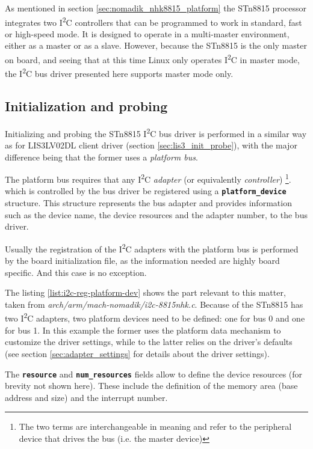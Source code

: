 \documentclass[a4paper,10pt]{article}
\newcommand{\icc}{I\textsuperscript{2}C }
\newcommand{\keyword}[1]{\texttt{\textbf{#1}}}
\begin{document}
\begin{multicols}{2}
As mentioned in section \ref{sec:nomadik_nhk8815_platform} the STn8815 processor
integrates two \icc controllers that can be programmed to work in standard, fast
or high-speed mode. It is designed to operate in a multi-master environment,
either as a master or as a slave. However, because the STn8815 is the only master
on board, and seeing that at this time Linux only operates \icc in master mode, 
the \icc bus driver presented here supports master mode only.


\subsection{Initialization and probing}
\label{sec:adapter_init_probe}
Initializing and probing the STn8815 \icc bus driver is performed in a similar
way as for LIS3LV02DL client driver (section \ref{sec:lis3_init_probe}), with
the major difference being that the former uses a \emph{platform bus}.

The platform bus requires that any \icc \emph{adapter} (or equivalently
\emph{controller})
\footnote{The two terms are interchangeable in meaning and refer to the
peripheral device that drives the bus (i.e. the master device)}.
which is controlled by the bus driver be registered using a \keyword{platform\_device} structure.
This structure represents the bus adapter and provides information such as the
device name, the device resources and the adapter number, to the bus driver.

Usually the registration of the \icc adapters with the platform bus is
performed by the board initialization file, as the information needed are
highly board specific. And this case is no exception.

The listing \ref{list:i2c-reg-platform-dev} shows the part relevant to this
matter, taken from \emph{arch/arm/mach-nomadik/i2c-8815nhk.c}. Because of the
STn8815 has two \icc adapters, two platform devices need to be defined: one for
bus 0 and one for bus 1.
In this example the former uses the platform data mechanism to customize the
driver settings, while to the latter relies on the driver's defaults
(see section \ref{sec:adapter_settings} for details about the driver settings).

The \keyword{resource} and \keyword{num\_resources} fields allow to define
the device resources (for brevity not shown here). These include the
definition of the memory area (base address and size) and the interrupt number.


\end{multicols}
\end{document}
